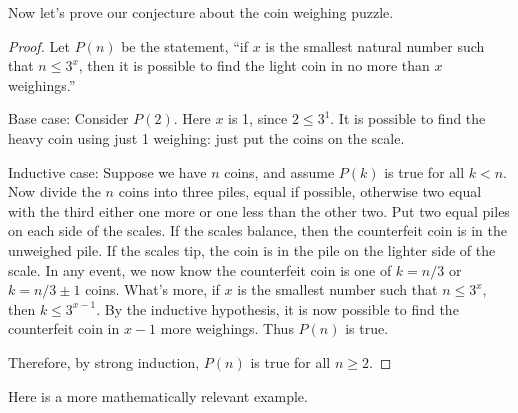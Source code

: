 \documentclass[12pt]{article}
\begin{document}
Now let's prove our conjecture about the coin weighing puzzle.

\begin{proof}
	Let $P(n)$ be the statement, ``if $x$ is the smallest natural number such that $n \le 3^x$, then it is possible to find the light coin in no more than $x$ weighings.''  
	
	Base case: Consider $P(2)$.  Here $x$ is 1, since $2 \le 3^1$.  It is possible to find the heavy coin using just 1 weighing: just put the coins on the scale.
	
	Inductive case: Suppose we have $n$ coins, and assume $P(k)$ is true for all $k < n$.  Now divide the $n$ coins into three piles, equal if possible, otherwise two equal with the third either one more or one less than the other two.  Put two equal piles on each side of the scales.  If the scales balance, then the counterfeit coin is in the unweighed pile.  If the scales tip, the coin is in the pile on the lighter side of the scale.  In any event, we now know the counterfeit coin is one of $k = n/3$ or $k = n/3\pm 1$ coins.  What's more, if $x$ is the smallest number such that $n \le 3^x$, then $k \le 3^{x-1}$.  By the inductive hypothesis, it is now possible to find the counterfeit coin in $x-1$ more weighings.  Thus $P(n)$ is true.
	
	Therefore, by strong induction, $P(n)$ is true for all $n \ge 2$.
\end{proof}

Here is a more mathematically relevant example.
\end{document}

